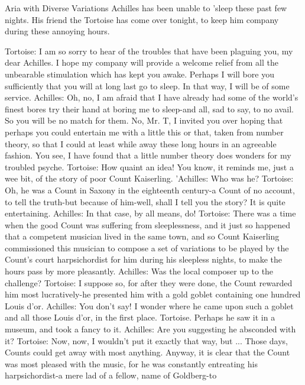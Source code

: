 
                     Aria with Diverse Variations
     Achilles has been unable to 'sleep these past few nights. His friend the
     Tortoise has come over tonight, to keep him company during these annoying
     hours.

Tortoise: I am so sorry to hear of the troubles that have been plaguing you, my dear
    Achilles. I hope my company will provide a welcome relief from all the unbearable
    stimulation which has kept you awake. Perhaps I will bore you sufficiently that you
    will at long last go to sleep. In that way, I will be of some service.
Achilles: Oh, no, I am afraid that I have already had some of the world's finest bores try
    their hand at boring me to sleep-and all, sad to say, to no avail. So you will be no
    match for them. No, Mr. T, I invited you over hoping that perhaps you could
    entertain me with a little this or that, taken from number theory, so that I could at
    least while away these long hours in an agreeable fashion. You see, I have found that
    a little number theory does wonders for my troubled psyche.
Tortoise: How quaint an idea! You know, it reminds me, just a wee bit, of the story of
    poor Count Kaiserling.
'Achilles: Who was he?
Tortoise: Oh, he was a Count in Saxony in the eighteenth century-a Count of no account,
    to tell the truth-but because of him-well, shall I tell you the story? It is quite
    entertaining.
Achilles: In that case, by all means, do!
Tortoise: There was a time when the good Count was suffering from sleeplessness, and it
    just so happened that a competent musician lived in the same town, and so Count
    Kaiserling commissioned this musician to compose a set of variations to be played
    by the Count's court harpsichordist for him during his sleepless nights, to make the
    hours pass by more pleasantly.
Achilles: Was the local composer up to the challenge?
Tortoise: I suppose so, for after they were done, the Count rewarded him most
    lucratively-he presented him with a gold goblet containing one hundred Louis d'or.
Achilles: You don't say! I wonder where he came upon such a goblet and all those Louis
    d'or, in the first place.
Tortoise. Perhaps he saw it in a museum, and took a fancy to it.
Achilles: Are you suggesting he absconded with it?
Tortoise: Now, now, I wouldn't put it exactly that way, but ... Those days, Counts could
    get away with most anything. Anyway, it is clear that the Count was most pleased
    with the music, for he was constantly entreating his harpsichordist-a mere lad of a
    fellow, name of Goldberg-to




